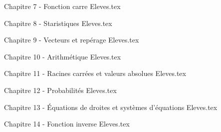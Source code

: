 \documentclass[11pt,a4paper,twoside,openany]{book}
\numberwithin{dummy}{section}
\theoremstyle{ocrenumboxTh}
\theoremstyle{ocrenumboxExercice}
\theoremstyle{ocrenumboxExercice}
\theoremstyle{ocrenumboxEx}
\theoremstyle{ocrenumboxEx}
\theoremstyle{ocrenumboxTh}
\theoremstyle{ocrenumboxTh*}
\theoremstyle{ocrenumboxTh}
\theoremstyle{ocrenumboxTh*}
\theoremstyle{ocrenumboxCoro}
\theoremstyle{ocrenumboxCoro*}
\theoremstyle{ocrenumboxCoro}
\theoremstyle{ocrenumboxCoro*}
\theoremstyle{ocrenumboxProp}
\theoremstyle{ocrenumboxProp*}
\theoremstyle{ocrenumboxProp}
\theoremstyle{ocrenumboxProp*}
\theoremstyle{ocrenumboxMéthode}
\theoremstyle{ocrenumboxMéthode}
\theoremstyle{ocrenumboxDef}
\theoremstyle{ocrenumboxDef*}
\theoremstyle{ocrenumboxDef}
\theoremstyle{ocrenumboxDef*}
\theoremstyle{ocrenumboxReg}
\theoremstyle{ocrenumboxReg*}
\theoremstyle{ocrenumboxReg}
\theoremstyle{ocrenumboxReg*}
\theoremstyle{ocrenumboxVoc}
\theoremstyle{ocrenumboxVoc}
\theoremstyle{ocrenumboxNot}
\theoremstyle{ocrenumboxNot}
\theoremstyle{ocrenumboxNot*}
\theoremstyle{ocrenumboxNot*}
\theoremstyle{ocrenum}
\begin{document}
\cleardoublepage
{Chapitre 7 - Fonction carre Eleves.tex}

\cleardoublepage
{Chapitre 8 - Staristiques Eleves.tex}

\cleardoublepage
{Chapitre 9 - Vecteurs et repérage Eleves.tex}

\cleardoublepage
{Chapitre 10 - Arithmétique Eleves.tex}

\cleardoublepage
{Chapitre 11 - Racines carrées et valeurs absolues Eleves.tex}

\cleardoublepage
{Chapitre 12 - Probabilités Eleves.tex}

\cleardoublepage
{Chapitre 13 - Équations de droites et systèmes d'équations Eleves.tex}

\cleardoublepage
{Chapitre 14 - Fonction inverse Eleves.tex}
\end{document}
